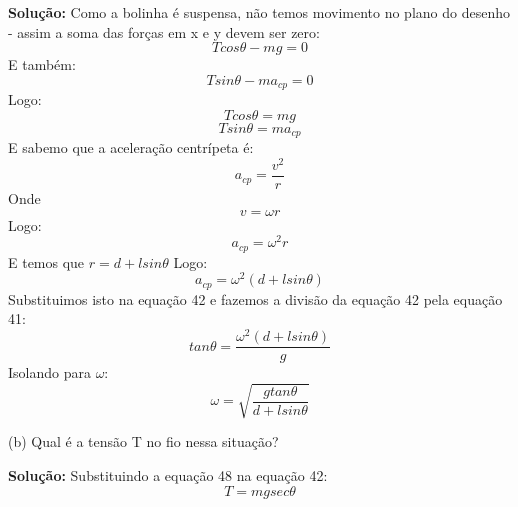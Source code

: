 \documentclass[12pt, a4paper]{article} %
\begin{document}
    \textbf{Solu\c{c}\~ao:}
    Como a bolinha \'e suspensa, não temos movimento no plano do desenho - assim a soma das forças em x e y devem ser zero:
    \begin{equation}
        Tcos\theta - mg = 0
    \end{equation}
    E tamb\'em:
    \begin{equation}
        Tsin\theta - ma_{cp} = 0
    \end{equation}
    Logo:
    \begin{equation}
        Tcos\theta = mg
    \end{equation}
    \begin{equation}
        Tsin\theta = ma_{cp}
    \end{equation}
    E sabemo que a acelera\c{c}\~ao centr\'ipeta \'e:
    \begin{equation}
        a_{cp} = \frac{v^2}{r}
    \end{equation}
    Onde
    \begin{equation}
        v = \omega r
    \end{equation}
    Logo:
    \begin{equation}
        a_{cp} = \omega^2 r
    \end{equation}
    E temos que $r=d+lsin\theta$
    Logo:
    \begin{equation}
        a_{cp} = \omega^2 (d+lsin\theta)
    \end{equation}
    Substituimos isto na equa\c{c}\~ao 42 e fazemos a divis\~ao da equa\c{c}\~ao 42 pela equa\c{c}\~ao 41:
    \begin{equation}
        tan\theta = \frac{\omega^2 (d+lsin\theta)}{g}
    \end{equation}
    Isolando para $\omega$:
    \begin{equation}
        \omega = \sqrt{\frac{g tan\theta}{d+lsin\theta}}
    \end{equation}

    (b) Qual \'e a tens\~ao T no fio nessa situa\c{c}\~ao?
    
    \textbf{Solu\c{c}\~ao:}
    Substituindo a equa\c{c}\~ao 48 na equa\c{c}\~ao 42:
    \begin{equation}
        T = mgsec\theta
    \end{equation}


       
\end{document}
